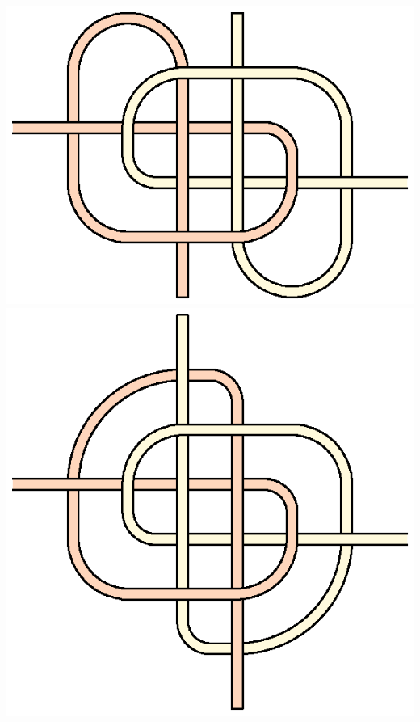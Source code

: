 \includegraphics[scale=0.5]{images/hunter-bend.eps}
\includegraphics[scale=0.5]{images/kolobok-goldobina.eps}
